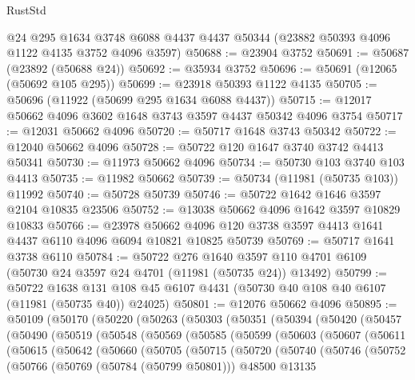 \begin{lexlean}{RustStd}
\begin{coremodule}
    @24
    @295
    @1634
    @3748
    @6088
    @4437
    @4437
    @50344
    (@23882 @50393 @4096 @1122 @4135 @3752 @4096 @3597)
@50688 := @23904 @3752
@50691 := @50687 (@23892 (@50688 @24))
@50692 := @35934 @3752
@50696 := @50691 (@12065 (@50692 @105 @295))
@50699 := @23918 @50393 @1122 @4135
@50705 := @50696 (@11922 (@50699 @295 @1634 @6088 @4437))
@50715 := @12017 @50662 @4096 @3602 @1648 @3743 @3597 @4437 @50342 @4096 @3754
@50717 := @12031 @50662 @4096
@50720 := @50717 @1648 @3743 @50342
@50722 := @12040 @50662 @4096
@50728 := @50722 @120 @1647 @3740 @3742 @4413 @50341
@50730 := @11973 @50662 @4096
@50734 := @50730 @103 @3740 @103 @4413
@50735 := @11982 @50662
@50739 := @50734 (@11981 (@50735 @103)) @11992
@50740 := @50728 @50739
@50746 := @50722 @1642 @1646 @3597 @2104 @10835 @23506
@50752 := @13038 @50662 @4096 @1642 @3597 @10829 @10833
@50766 := @23978
    @50662
    @4096
    @120
    @3738
    @3597
    @4413
    @1641
    @4437
    @6110
    @4096
    @6094
    @10821
    @10825
    @50739
@50769 := @50717 @1641 @3738 @6110
@50784 := @50722
    @276
    @1640
    @3597
    @110
    @4701
    @6109
    (@50730 @24 @3597 @24 @4701 (@11981 (@50735 @24)) @13492)
@50799 := @50722
    @1638
    @131
    @108
    @45
    @6107
    @4431
    (@50730 @40 @108 @40 @6107 (@11981 (@50735 @40)) @24025)
@50801 := @12076 @50662 @4096
@50895 := @50109
    (@50170
      (@50220
        (@50263
          (@50303
            (@50351
              (@50394
                (@50420
                  (@50457
                    (@50490
                      (@50519
                        (@50548
                          (@50569
                            (@50585
                              (@50599
                                (@50603
                                  (@50607
                                    (@50611
                                      (@50615
                                        (@50642
                                          (@50660
                                            (@50705
                                              (@50715
                                                (@50720
                                                  (@50740
                                                    (@50746
                                                      (@50752
                                                        (@50766
                                                          (@50769 (@50784 (@50799 @50801)))
                                                          @48500
                                                          @13135

\end{coremodule}
\end{lexlean}
